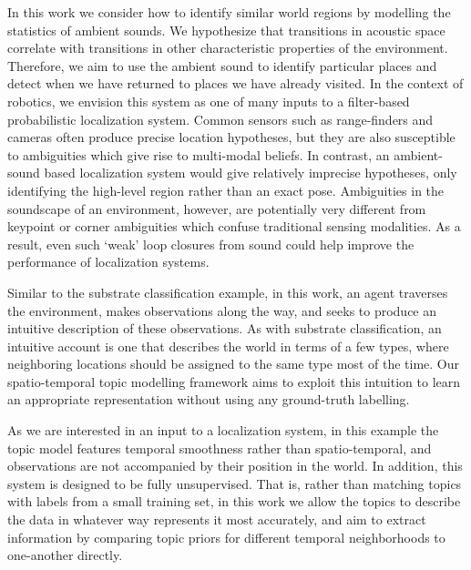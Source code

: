 In this work we consider how to identify similar world regions by modelling the statistics of ambient sounds. We hypothesize that transitions in acoustic space correlate with transitions in other characteristic properties of the environment. Therefore, we aim to use the ambient sound to identify particular places and detect when we have returned to places we have already visited. In the context of robotics, we envision this system as one of many inputs to a filter-based probabilistic localization system. Common sensors such as range-finders and cameras often produce precise location hypotheses, but they are also susceptible to ambiguities which give rise to multi-modal beliefs. In contrast, an ambient-sound based localization system would give relatively imprecise hypotheses, only identifying the high-level region rather than an exact pose. Ambiguities in the soundscape of an environment, however, are potentially very different from keypoint or corner ambiguities which confuse traditional sensing modalities. As a result, even such `weak' loop closures from sound could help improve the performance of localization systems.

Similar to the substrate classification example, in this work, an agent traverses the environment, makes observations along the way, and seeks to produce an intuitive description of these observations. As with substrate classification, an intuitive account is one that describes the world in terms of a few types, where neighboring locations should be assigned to the same type most of the time. Our spatio-temporal topic modelling framework aims to exploit this intuition to learn an appropriate representation without using any ground-truth labelling.

As we are interested in an input to a localization system, in this example the topic model features temporal smoothness rather than spatio-temporal, and observations are not accompanied by their position in the world. In addition, this system is designed to be fully unsupervised. That is, rather than matching topics with labels from a small training set, in this work we allow the topics to describe the data in whatever way represents it most accurately, and aim to extract information by comparing topic priors for different temporal neighborhoods to one-another directly.


